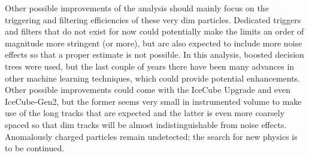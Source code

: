 \noindent Other possible improvements of the analysis should mainly focus on the triggering and filtering efficiencies of these very dim particles. Dedicated triggers and filters that do not exist for now could potentially make the limits an order of magnitude more stringent (or more), but are also expected to include more noise effects so that a proper estimate is not possible. In this analysis, boosted decision trees were used, but the last couple of years there have been many advances in other machine learning techniques, which could provide potential enhancements.
Other possible improvements could come with the IceCube Upgrade and even IceCube-Gen2, but the former seems very small in instrumented volume to make use of the long tracks that are expected and the latter is even more coarsely spaced so that dim tracks will be almost indistinguishable from noise effects.\\

\noindent Anomalously charged particles remain undetected; the search for new physics is to be continued.